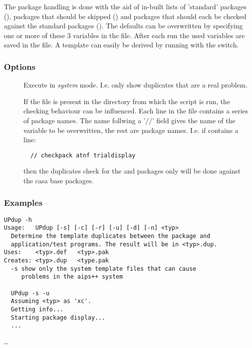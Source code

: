 The package handling is done with the aid of in-built lists of
'standard' packages (), packages that should be
skipped () and packages that should each be checked
against the standard  packages (). The
defaults can be overwritten by specifying one or more of these 3
variables in the   file. After each run the used
variables are saved in the  file. A template can
easily be derived by running with the  switch.

\subsubsection*{Options}

\begin{description}
\item[]
    Execute in {\em system} mode. I.e. only show duplicates that are a
    real problem.
\item[]
    If the  file is present in the directory from which
    the  script is run, the checking behaviour can be
    influenced. Each line in the file contains a series of package names. The
    name follwing a '//' field gives the name of the variable to be
    overwritten, the rest are package names. I.e. if
     contains a line:
\begin{verbatim}
  // checkpack atnf trialdisplay
\end{verbatim}
    then the duplicates check for the  and
     packages only will be done against the casa
    base packages.
\end{description}

\subsubsection*{Examples}

\begin{verbatim}
UPdup -h
Usage:   UPdup [-s] [-c] [-r] [-u] [-d] [-n] <typ>
  Determine the template duplicates between the package and
  application/test programs. The result will be in <typ>.dup.
Uses:    <typ>.def   <typ>.pak
Creates: <typ>.dup   <type.pak
  -s show only the system template files that can cause
     problems in the aips++ system

  UPdup -s -u
  Assuming <typ> as 'xc'.
  Getting info...
  Starting package display...
  ...
\end{verbatim}
\ldots

